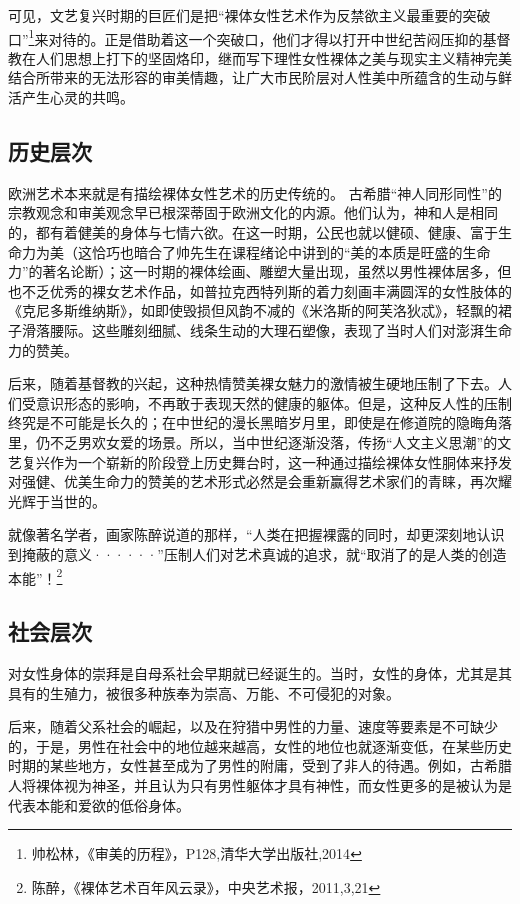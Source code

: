 \documentclass[UTF8,a4paper]{ctexart}
\begin{document}
可见，文艺复兴时期的巨匠们是把“裸体女性艺术作为反禁欲主义最重要的突破口”\footnote{帅松林，《审美的历程》，P128,清华大学出版社,2014}来对待的。正是借助着这一个突破口，他们才得以打开中世纪苦闷压抑的基督教在人们思想上打下的坚固烙印，继而写下理性女性裸体之美与现实主义精神完美结合所带来的无法形容的审美情趣，让广大市民阶层对人性美中所蕴含的生动与鲜活产生心灵的共鸣。

\subsection{历史层次}
欧洲艺术本来就是有描绘裸体女性艺术的历史传统的。
古希腊``神人同形同性''的宗教观念和审美观念早已根深蒂固于欧洲文化的内源。他们认为，神和人是相同的，都有着健美的身体与七情六欲。在这一时期，公民也就以健硕、健康、富于生命力为美（这恰巧也暗合了帅先生在课程绪论中讲到的``美的本质是旺盛的生命力''的著名论断）；这一时期的裸体绘画、雕塑大量出现，虽然以男性裸体居多，但也不乏优秀的裸女艺术作品，如普拉克西特列斯的着力刻画丰满圆浑的女性肢体的《克尼多斯维纳斯》，如即使毁损但风韵不减的《米洛斯的阿芙洛狄忒》，轻飘的裙子滑落腰际。这些雕刻细腻、线条生动的大理石塑像，表现了当时人们对澎湃生命力的赞美。

后来，随着基督教的兴起，这种热情赞美裸女魅力的激情被生硬地压制了下去。人们受意识形态的影响，不再敢于表现天然的健康的躯体。但是，这种反人性的压制终究是不可能是长久的；在中世纪的漫长黑暗岁月里，即使是在修道院的隐晦角落里，仍不乏男欢女爱的场景。所以，当中世纪逐渐没落，传扬``人文主义思潮''的文艺复兴作为一个崭新的阶段登上历史舞台时，这一种通过描绘裸体女性胴体来抒发对强健、优美生命力的赞美的艺术形式必然是会重新赢得艺术家们的青睐，再次耀光辉于当世的。

就像著名学者，画家陈醉说道的那样，``人类在把握裸露的同时，却更深刻地认识到掩蔽的意义······''压制人们对艺术真诚的追求，就``取消了的是人类的创造本能''！\footnote{陈醉，《裸体艺术百年风云录》，中央艺术报，2011,3,21}

\subsection{社会层次}
对女性身体的崇拜是自母系社会早期就已经诞生的。当时，女性的身体，尤其是其具有的生殖力，被很多种族奉为崇高、万能、不可侵犯的对象。

后来，随着父系社会的崛起，以及在狩猎中男性的力量、速度等要素是不可缺少的，于是，男性在社会中的地位越来越高，女性的地位也就逐渐变低，在某些历史时期的某些地方，女性甚至成为了男性的附庸，受到了非人的待遇。例如，古希腊人将裸体视为神圣，并且认为只有男性躯体才具有神性，而女性更多的是被认为是代表本能和爱欲的低俗身体。
\end{document}
